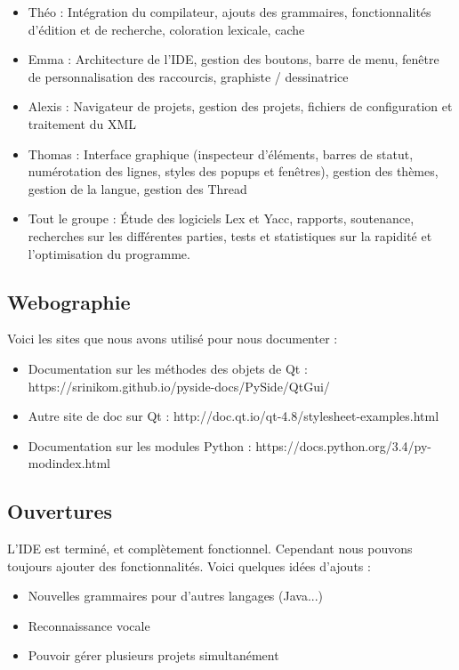 \documentclass[a4paper,12pt]{article}
\begin{document}
	\begin{itemize}
		\item Théo : Intégration du compilateur, ajouts des grammaires, fonctionnalités d'édition et de recherche, coloration lexicale, cache
		\item Emma : Architecture de l'IDE, gestion des boutons, barre de menu, fenêtre de personnalisation des raccourcis, graphiste / dessinatrice
		\item Alexis : Navigateur de projets, gestion des projets, fichiers de configuration et traitement du XML
		\item Thomas : Interface graphique (inspecteur d'éléments, barres de statut, numérotation des lignes, styles des popups et fenêtres), gestion des thèmes, gestion de la langue, gestion des Thread
		\item Tout le groupe : Étude des logiciels Lex et Yacc, rapports, soutenance, recherches sur les différentes parties, tests et statistiques sur la rapidité et l'optimisation du programme.
	\end{itemize}
	
\subsection{Webographie}
	
	Voici les sites que nous avons utilisé pour nous documenter :
	
	\begin{itemize}
		\item Documentation sur les méthodes des objets de Qt : https://srinikom.github.io/pyside-docs/PySide/QtGui/
		\item Autre site de doc sur Qt : http://doc.qt.io/qt-4.8/stylesheet-examples.html
		\item Documentation sur les modules Python : https://docs.python.org/3.4/py-modindex.html
	\end{itemize}
	
\subsection{Ouvertures}

	L'IDE est terminé, et complètement fonctionnel. Cependant nous pouvons toujours ajouter des fonctionnalités. Voici quelques idées d'ajouts :
	
	\begin{itemize}
		\item Nouvelles grammaires pour d'autres langages (Java...)
		\item Reconnaissance vocale
		\item Pouvoir gérer plusieurs projets simultanément
	\end{itemize}
\end{document}
